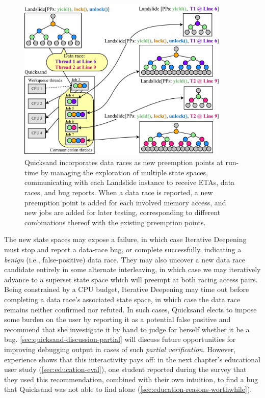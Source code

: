 \begin{figure}[t]
	\begin{center}
        \includegraphics[width=0.9\textwidth]{dr-jobs-v2.pdf}
	\end{center}
	\caption[Quicksand incorporates data races as new preemption points at run-time.]
		{Quicksand incorporates data races as new preemption points at run-time
		by managing the exploration of multiple state spaces,
		communicating with each Landslide instance to receive ETAs, data races, and bug reports.
                When a data race is reported,
                a new preemption point is added for each involved memory access,
                and new jobs are added for later testing,
                corresponding to different combinations thereof with the existing preemption points.}
        \label{fig:new-dr-jobs}
\end{figure}

The new state spaces may expose a failure, in which case Iterative Deepening must stop and report a data-race bug,
or complete successfully, indicating a {\em benign} (i.e., false-positive) data race.
They may also uncover a new data race candidate entirely in some alternate interleaving,
in which case we may iteratively advance to a superset state space which will preempt at both racing access pairs.
Being constrained by a CPU budget,
Iterative Deepening may time out before completing a data race's associated state space,
in which case the data race remains neither confirmed nor refuted.
In such cases, Quicksand elects to impose some burden on the user
by reporting it as a potential false positive
and recommend that she investigate it by hand to judge for herself whether it be a bug.
\cref{sec:quicksand-discussion-partial} will discuss future opportunities for improving
debugging output in cases of such {\em partial verification}.
However, experience shows that this interactivity pays off:
in the next chapter's educational user study (\cref{sec:education-eval}),
one student reported during the survey that they used this recommendation,
combined with their own intuition,
to find a bug that Quicksand was not able to find alone (\cref{sec:education-reasons-worthwhile}).

